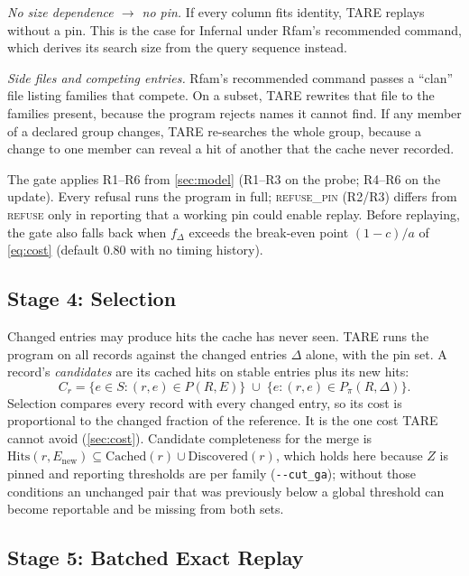 \documentclass[letterpaper,twocolumn,10pt]{article}
\theoremstyle{definition}
\newcommand{\sys}{TARE\xspace}
\newcommand{\sys}{PARE\xspace}
\newcommand{\dec}[1]{\textsc{#1}}
\newcommand{\cutga}{\texttt{-{}-cut\_ga}\xspace}
\begin{document}
\textit{No size dependence $\rightarrow$ no pin.} If every column fits identity, \sys replays without a pin. This is the
case for Infernal under Rfam's recommended command, which derives its search size from the query sequence instead.

\textit{Side files and competing entries.} Rfam's recommended command passes a ``clan'' file listing families that
compete. On a subset, \sys rewrites that file to the families present, because the program rejects names it cannot
find. If any member of a declared group changes, \sys re\nobreakdash-searches the whole group, because a change to one member
can reveal a hit of another that the cache never recorded.

The gate applies R1--R6 from \cref{sec:model} (R1--R3 on the probe; R4--R6 on the update). Every refusal runs the program
in full; \dec{refuse\_pin} (R2/R3) differs from \dec{refuse} only in reporting that a working pin could enable replay.
Before replaying, the gate also falls back when $f_\Delta$ exceeds the break\nobreakdash-even point $(1-c)/a$ of \cref{eq:cost}
(default 0.80 with no timing history).

\subsection{Stage 4: Selection}

Changed entries may produce hits the cache has never seen. \sys runs the program on all records against the changed
entries $\Delta$ alone, with the pin set. A record's \textit{candidates} are its cached hits on stable entries plus its
new hits:
\begin{equation}
C_r = \{e \in S : (r,e) \in P(R,E)\} \;\cup\; \{e : (r,e) \in P_\pi(R,\Delta)\}.
\label{eq:cand}
\end{equation}
Selection compares every record with every changed entry, so its cost is proportional to the changed fraction of the
reference. It is the one cost \sys cannot avoid (\cref{sec:cost}).
Candidate completeness for the merge is
$\mathrm{Hits}(r,E_{\mathrm{new}})\subseteq\mathrm{Cached}(r)\cup\mathrm{Discovered}(r)$, which holds here because $Z$ is pinned and
reporting thresholds are per family (\cutga); without those conditions an unchanged pair that was previously below a
global threshold can become reportable and be missing from both sets.

\subsection{Stage 5: Batched Exact Replay}
\label{sec:replay}
\end{document}
